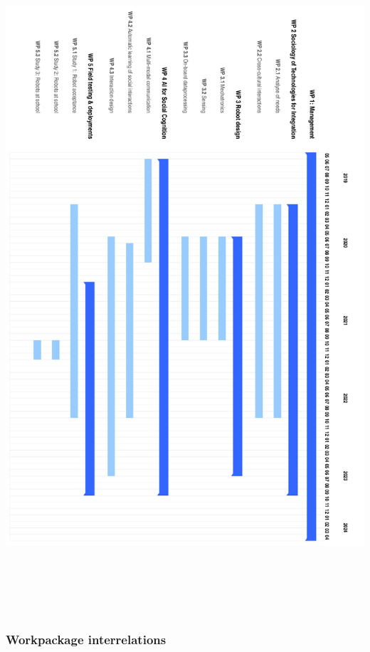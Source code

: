 \documentclass[]{article}
\begin{document}
\includegraphics[width=\textwidth,height=25cm]{gantt.pdf}\\

\subsubsection{Workpackage interrelations}\label{workpackage-interrelations}
\end{document}
